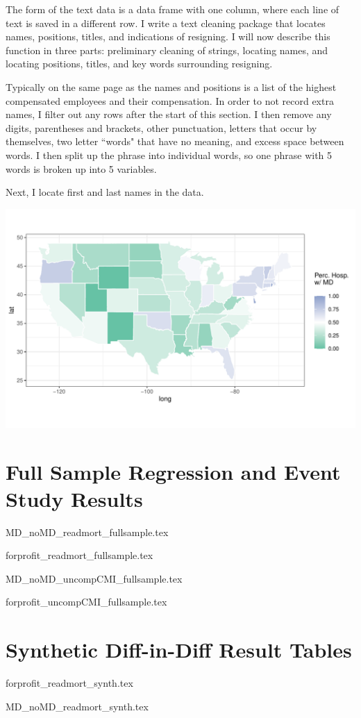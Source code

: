 \documentclass[12pt]{article}
\begin{document}
The form of the text data is a data frame with one column, where each line of text is saved in a different row. I write a text cleaning package that locates names, positions, titles, and indications of resigning. I will now describe this function in three parts: preliminary cleaning of strings, locating names, and locating positions, titles, and key words surrounding resigning. 

Typically on the same page as the names and positions is a list of the highest compensated employees and their compensation. In order to not record extra names, I filter out any rows after the start of this section. I then remove any digits, parentheses and brackets, other punctuation, letters that occur by themselves, two letter ``words" that have no meaning, and excess space between words. I then split up the phrase into individual words, so one phrase with 5 words is broken up into 5 variables. 

Next, I locate first and last names in the data. 

\includegraphics[width=\textwidth]{Objects/has_doc_avg_map.pdf}


\section{Full Sample Regression and Event Study Results}\label{app:fullsample}

{MD_noMD_readmort_fullsample.tex}

{forprofit_readmort_fullsample.tex}

{MD_noMD_uncompCMI_fullsample.tex}

{forprofit_uncompCMI_fullsample.tex}

\section{Synthetic Diff-in-Diff Result Tables}

{forprofit_readmort_synth.tex}

{MD_noMD_readmort_synth.tex}


    

    

    

    

    

    

	
	
	
\end{document}
